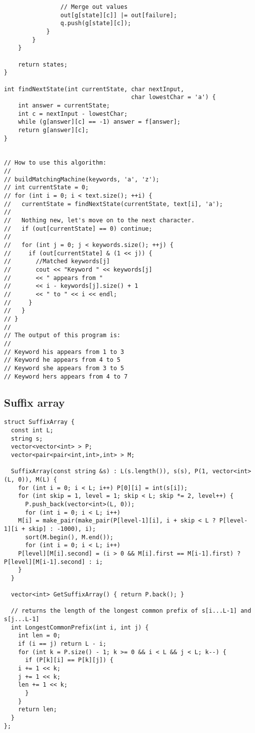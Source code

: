 \documentclass[10pt,letterpaper,twocolumn,twosided]{article}
\begin{document}
\begin{lstlisting}
                // Merge out values
                out[g[state][c]] |= out[failure];
                q.push(g[state][c]);
            }
        }
    }

    return states;
}

int findNextState(int currentState, char nextInput,
                                    char lowestChar = 'a') {
    int answer = currentState;
    int c = nextInput - lowestChar;
    while (g[answer][c] == -1) answer = f[answer];
    return g[answer][c];
}


// How to use this algorithm:
//
// buildMatchingMachine(keywords, 'a', 'z');
// int currentState = 0;
// for (int i = 0; i < text.size(); ++i) {
//   currentState = findNextState(currentState, text[i], 'a');
//
//   Nothing new, let's move on to the next character.
//   if (out[currentState] == 0) continue;
//
//   for (int j = 0; j < keywords.size(); ++j) {
//     if (out[currentState] & (1 << j)) {
//       //Matched keywords[j]
//       cout << "Keyword " << keywords[j]
//       << " appears from "
//       << i - keywords[j].size() + 1
//       << " to " << i << endl;
//     }
//   }
// }
//
// The output of this program is:
//
// Keyword his appears from 1 to 3
// Keyword he appears from 4 to 5
// Keyword she appears from 3 to 5
// Keyword hers appears from 4 to 7
\end{lstlisting}

\subsection{Suffix array}

\begin{lstlisting}
struct SuffixArray {
  const int L;
  string s;
  vector<vector<int> > P;
  vector<pair<pair<int,int>,int> > M;

  SuffixArray(const string &s) : L(s.length()), s(s), P(1, vector<int>(L, 0)), M(L) {
    for (int i = 0; i < L; i++) P[0][i] = int(s[i]);
    for (int skip = 1, level = 1; skip < L; skip *= 2, level++) {
      P.push_back(vector<int>(L, 0));
      for (int i = 0; i < L; i++) 
	M[i] = make_pair(make_pair(P[level-1][i], i + skip < L ? P[level-1][i + skip] : -1000), i);
      sort(M.begin(), M.end());
      for (int i = 0; i < L; i++) 
	P[level][M[i].second] = (i > 0 && M[i].first == M[i-1].first) ? P[level][M[i-1].second] : i;
    }    
  }

  vector<int> GetSuffixArray() { return P.back(); }

  // returns the length of the longest common prefix of s[i...L-1] and s[j...L-1]
  int LongestCommonPrefix(int i, int j) {
    int len = 0;
    if (i == j) return L - i;
    for (int k = P.size() - 1; k >= 0 && i < L && j < L; k--) {
      if (P[k][i] == P[k][j]) {
	i += 1 << k;
	j += 1 << k;
	len += 1 << k;
      }
    }
    return len;
  }
};
\end{lstlisting}
\end{document}
